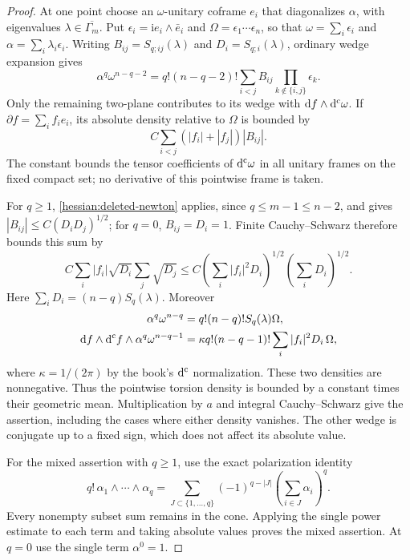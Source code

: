 \begin{proof}
At one point choose an $\omega$-unitary coframe $e_i$
that diagonalizes $\alpha$, with eigenvalues $\lambda\in\overline{\Gamma_m}$. Put $\epsilon_i=\mathrm i e_i\wedge\bar e_i$
and $\Omega=\epsilon_1\cdots\epsilon_n$, so that
$\omega=\sum_i\epsilon_i$ and $\alpha=\sum_i\lambda_i\epsilon_i$.
Writing $B_{ij}=S_{q;ij}(\lambda)$ and $D_i=S_{q;i}(\lambda)$,
ordinary wedge expansion gives
\[
 \alpha^q\omega^{n-q-2}
 =q!(n-q-2)!\sum_{i<j}B_{ij}
                           \prod_{k\notin\{i,j\}}\epsilon_k.
\]
Only the remaining two-plane contributes to its wedge with
$\mathrm df\wedge\mathrm d^{\mathrm c}\omega$. If $\partial f=\sum_i f_i e_i$,
its absolute density relative to $\Omega$ is bounded by
\[
 C\sum_{i<j}(|f_i|+|f_j|)|B_{ij}|.
\]
The constant bounds the tensor coefficients of $\mathrm d^{\mathrm c}\omega$ in all
unitary frames on the fixed compact set; no derivative of this
pointwise frame is taken.

For $q\geq1$, \cref{hessian:deleted-newton} applies, since
$q\leq m-1\leq n-2$, and gives $|B_{ij}|\leq C(D_iD_j)^{1/2}$; for
$q=0$, $B_{ij}=D_i=1$. Finite Cauchy--Schwarz therefore bounds this sum by
\[
 C\sum_i|f_i|\sqrt{D_i}\sum_j\sqrt{D_j}
 \leq C\left(\sum_i|f_i|^2D_i\right)^{1/2}
          \left(\sum_iD_i\right)^{1/2}.
\]
Here $\sum_iD_i=(n-q)S_q(\lambda)$. Moreover
\[
 \begin{aligned}
 \alpha^q\omega^{n-q}&=q!(n-q)!S_q(\lambda)\Omega,\\
 \mathrm df\wedge\mathrm d^{\mathrm c} f\wedge \alpha^q\omega^{n-q-1}
   &=\kappa q!(n-q-1)!\sum_i|f_i|^2D_i\,\Omega,
 \end{aligned}
\]
where $\kappa=1/(2\pi)$ by the book's $\mathrm d^{\mathrm c}$ normalization.
These two densities are nonnegative. Thus the pointwise torsion
density is bounded by a constant times their geometric mean.
Multiplication by $a$ and integral Cauchy--Schwarz give the assertion,
including the cases where either density vanishes. The other wedge
is conjugate up to a fixed sign, which does not affect its absolute
value.

For the mixed assertion with $q\geq1$, use the exact polarization
identity
\[
 q!\,\alpha_1\wedge\cdots\wedge\alpha_q
   =\sum_{J\subset\{1,\ldots,q\}}
           (-1)^{q-|J|}\left(\sum_{i\in J}\alpha_i\right)^q.
\]
Every nonempty subset sum remains in the cone. Applying the single
power estimate to each term and taking absolute values proves the
mixed assertion. At $q=0$ use the single term $\alpha^0=1$.
\end{proof}

